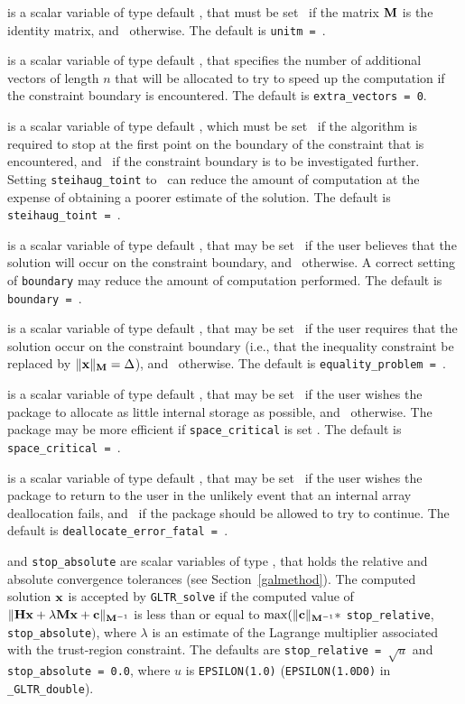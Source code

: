 \documentclass{galahad}
\newcommand{\packagename}{GL\-TR}
\newcommand{\fullpackagename}{\libraryname\_\packagename}
\begin{document}
\begin{description}
 is a scalar variable of type default \logical, that
must be set \true\ if the matrix ${\mathbf{M}}$ is the identity matrix, and
\false\
otherwise.
The default is {\tt unitm = \true}.

 is a scalar variable of type default \integer,
that specifies the number of additional vectors of length $n$
that will be allocated to try to speed up the computation if the
constraint boundary  is encountered.
The default is {\tt extra\_vectors = 0}.

 is a scalar variable of type default \logical,
which must be set \true\ if the algorithm is required to stop at
the first point on the boundary of the constraint that is encountered,
and \false\  if the constraint boundary is to be investigated
further.  Setting {\tt steihaug\_toint} to \true\ can reduce the
amount of computation at the expense of obtaining a poorer estimate of
the solution.
The default is {\tt steihaug\_toint = \false}.

 is a scalar variable of type default \logical, that
may be set \true\ if the user believes that the solution will
occur on the constraint boundary, and \false\
otherwise. A correct setting of {\tt boundary} may reduce the amount of
computation performed.
The default is {\tt boundary = \false}.

 is a scalar variable of type default \logical, that
may be set \true\ if the user requires that the solution
occur on the constraint boundary (i.e., that the inequality constraint be
replaced by $\|{\mathbf{x}}\|_{{\mathbf{M}}} = \Delta$), and \false\ otherwise.
The default is {\tt equality\_problem = \false}.

 is a scalar variable of type default \logical, that
may be set \true\ if the user wishes the package to allocate as little
internal storage as possible, and \false\ otherwise. The package may
be more efficient if {\tt space\_critical} is set \false.
The default is {\tt space\_critical = \false}.

 is a scalar variable of type default \logical,
that may be set \true\ if the user wishes the package to return to the user
in the unlikely event that an internal array deallocation fails,
and \false\ if the package should be allowed to try to continue.
The default is {\tt deallocate\_error\_fatal = \false}.

 and {\tt stop\_absolute} are scalar variables of type
\realdp, that holds the
relative and absolute convergence tolerances (see Section~\ref{galmethod}).
The computed solution ${\mathbf{x}}$ is accepted by {\tt \packagename\_solve}
if the computed value of
$\|{\mathbf{H}} {\mathbf{x}} + \lambda {\mathbf{M}} {\mathbf{x}} + {\mathbf{c}}\|_{{{\mathbf{M}}^{-1}}} $ is less than or equal
to $\max (\| {\mathbf{c}}\|_{{\mathbf{M}}^{-1}} \ast$ {\tt stop\_relative},
{\tt stop\_absolute}$)$, where $\lambda$ is an estimate of the Lagrange
multiplier associated with the trust-region constraint.
The defaults are {\tt stop\_relative = $\sqrt{u}$} and
{\tt stop\_absolute = 0.0},
where $u$ is {\tt EPSILON(1.0)} ({\tt EPSILON(1.0D0)} in
{\tt \fullpackagename\_double}).


\end{description}
\end{document}
